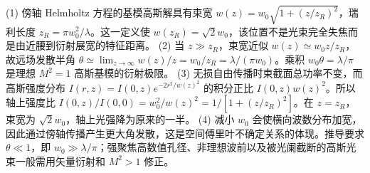 (1) 傍轴 Helmholtz 方程的基模高斯解具有束宽 \(w(z)=w_0\sqrt{1+(z/z_R)^2}\)，瑞利长度 \(z_R=\pi w_0^2/\lambda\)。这一定义使 \(w(z_R)=\sqrt2w_0\)，该位置不是光束完全失焦而是由近腰到衍射展宽的特征距离。
(2) 当 \(z\gg z_R\)，束宽近似 \(w(z)\simeq w_0z/z_R\)，故远场发散半角 \(\theta\simeq\lim_{z\to\infty}w(z)/z=w_0/z_R=\lambda/(\pi w_0)\)。乘积 \(w_0\theta=\lambda/\pi\) 是理想 \(M^2=1\) 高斯基模的衍射极限。
(3) 无损自由传播时束截面总功率不变，而高斯强度分布 \(I(r,z)=I(0,z)e^{-2r^2/w(z)^2}\) 的积分正比 \(I(0,z)w(z)^2\)。所以轴上强度比 \(I(0,z)/I(0,0)=w_0^2/w(z)^2=1/[1+(z/z_R)^2]\)。在 \(z=z_R\)，束宽为 \(\sqrt2w_0\)，轴上光强降为原来的一半。
(4) 减小 \(w_0\) 会使横向波数分布加宽，因此通过傍轴传播产生更大角发散，这是空间傅里叶不确定关系的体现。推导要求 \(\theta\ll1\)，即 \(w_0\gg\lambda/\pi\)；强聚焦高数值孔径、非理想波前以及被光阑截断的高斯光束一般需用矢量衍射和 \(M^2>1\) 修正。
